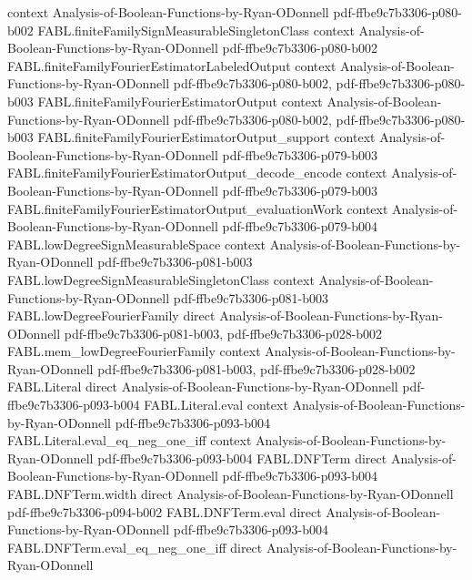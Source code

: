 \begin{theorem}
  {context}
  {Analysis-of-Boolean-Functions-by-Ryan-ODonnell}
  {pdf-ffbe9c7b3306-p080-b002}
\proofstep
  {FABL.finiteFamilySignMeasurableSingletonClass}
  {context}
  {Analysis-of-Boolean-Functions-by-Ryan-ODonnell}
  {pdf-ffbe9c7b3306-p080-b002}
\proofstep
  {FABL.finiteFamilyFourierEstimatorLabeledOutput}
  {context}
  {Analysis-of-Boolean-Functions-by-Ryan-ODonnell}
  {pdf-ffbe9c7b3306-p080-b002,
    pdf-ffbe9c7b3306-p080-b003}
\proofstep
  {FABL.finiteFamilyFourierEstimatorOutput}
  {context}
  {Analysis-of-Boolean-Functions-by-Ryan-ODonnell}
  {pdf-ffbe9c7b3306-p080-b002,
    pdf-ffbe9c7b3306-p080-b003}
\proofstep
  {FABL.finiteFamilyFourierEstimatorOutput_support}
  {context}
  {Analysis-of-Boolean-Functions-by-Ryan-ODonnell}
  {pdf-ffbe9c7b3306-p079-b003}
\proofstep
  {FABL.finiteFamilyFourierEstimatorOutput_decode_encode}
  {context}
  {Analysis-of-Boolean-Functions-by-Ryan-ODonnell}
  {pdf-ffbe9c7b3306-p079-b003}
\proofstep
  {FABL.finiteFamilyFourierEstimatorOutput_evaluationWork}
  {context}
  {Analysis-of-Boolean-Functions-by-Ryan-ODonnell}
  {pdf-ffbe9c7b3306-p079-b004}
\proofstep
  {FABL.lowDegreeSignMeasurableSpace}
  {context}
  {Analysis-of-Boolean-Functions-by-Ryan-ODonnell}
  {pdf-ffbe9c7b3306-p081-b003}
\proofstep
  {FABL.lowDegreeSignMeasurableSingletonClass}
  {context}
  {Analysis-of-Boolean-Functions-by-Ryan-ODonnell}
  {pdf-ffbe9c7b3306-p081-b003}
\proofstep
  {FABL.lowDegreeFourierFamily}
  {direct}
  {Analysis-of-Boolean-Functions-by-Ryan-ODonnell}
  {pdf-ffbe9c7b3306-p081-b003,
    pdf-ffbe9c7b3306-p028-b002}
\proofstep
  {FABL.mem_lowDegreeFourierFamily}
  {context}
  {Analysis-of-Boolean-Functions-by-Ryan-ODonnell}
  {pdf-ffbe9c7b3306-p081-b003,
    pdf-ffbe9c7b3306-p028-b002}
\proofstep
  {FABL.Literal}
  {direct}
  {Analysis-of-Boolean-Functions-by-Ryan-ODonnell}
  {pdf-ffbe9c7b3306-p093-b004}
\proofstep
  {FABL.Literal.eval}
  {context}
  {Analysis-of-Boolean-Functions-by-Ryan-ODonnell}
  {pdf-ffbe9c7b3306-p093-b004}
\proofstep
  {FABL.Literal.eval_eq_neg_one_iff}
  {context}
  {Analysis-of-Boolean-Functions-by-Ryan-ODonnell}
  {pdf-ffbe9c7b3306-p093-b004}
\proofstep
  {FABL.DNFTerm}
  {direct}
  {Analysis-of-Boolean-Functions-by-Ryan-ODonnell}
  {pdf-ffbe9c7b3306-p093-b004}
\proofstep
  {FABL.DNFTerm.width}
  {direct}
  {Analysis-of-Boolean-Functions-by-Ryan-ODonnell}
  {pdf-ffbe9c7b3306-p094-b002}
\proofstep
  {FABL.DNFTerm.eval}
  {direct}
  {Analysis-of-Boolean-Functions-by-Ryan-ODonnell}
  {pdf-ffbe9c7b3306-p093-b004}
\proofstep
  {FABL.DNFTerm.eval_eq_neg_one_iff}
  {direct}
  {Analysis-of-Boolean-Functions-by-Ryan-ODonnell}

\end{theorem}
